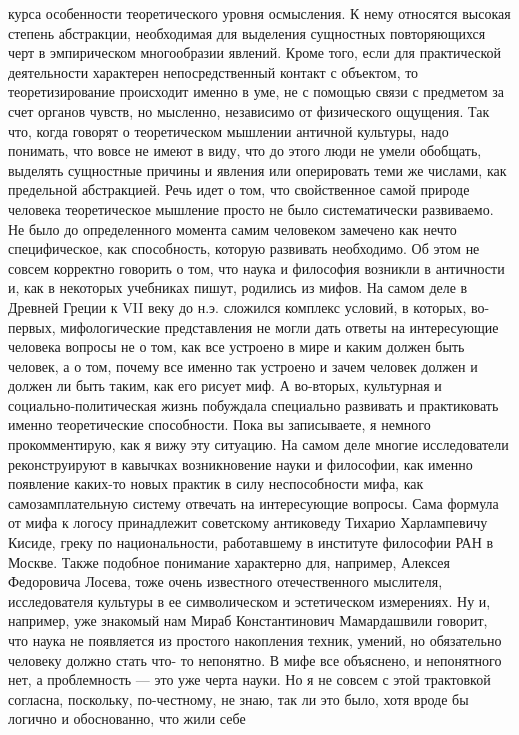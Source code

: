 курса особенности теоретического уровня осмысления. К нему относятся высокая
степень абстракции, необходимая для выделения сущностных повторяющихся черт в
эмпирическом многообразии явлений. Кроме того, если для практической
деятельности характерен непосредственный контакт с объектом, то теоретизирование
происходит именно в уме, не с помощью связи с предметом за счет органов чувств,
но мысленно, независимо от физического ощущения. Так что, когда говорят о
теоретическом мышлении античной культуры, надо понимать, что вовсе не имеют в
виду, что до этого люди не умели обобщать, выделять сущностные причины и явления
или оперировать теми же числами, как предельной абстракцией. Речь идет о том,
что свойственное самой природе человека теоретическое мышление просто не было
систематически развиваемо. Не было до определенного момента самим человеком
замечено как нечто специфическое, как способность, которую развивать необходимо.
Об этом не совсем корректно говорить о том, что наука и философия возникли в
античности и, как в некоторых учебниках пишут, родились из мифов. На самом деле
в Древней Греции к VII веку до н.э. сложился комплекс условий, в которых, во-
первых, мифологические представления не могли дать ответы на интересующие
человека вопросы не о том, как все устроено в мире и каким должен быть человек,
а о том, почему все именно так устроено и зачем человек должен и должен ли быть
таким, как его рисует миф. А во-вторых, культурная и социально-политическая
жизнь побуждала специально развивать и практиковать именно теоретические
способности. Пока вы записываете, я немного прокомментирую, как я вижу эту
ситуацию. На самом деле многие исследователи реконструируют в кавычках
возникновение науки и философии, как именно появление каких-то новых практик в
силу неспособности мифа, как самозамплательную систему отвечать на интересующие
вопросы. Сама формула от мифа к логосу принадлежит советскому антиковеду Тихарио
Харлампевичу Кисиде, греку по национальности, работавшему в институте философии
РАН в Москве. Также подобное понимание характерно для, например, Алексея
Федоровича Лосева, тоже очень известного отечественного мыслителя, исследователя
культуры в ее символическом и эстетическом измерениях. Ну и, например, уже
знакомый нам Мираб Константинович Мамардашвили говорит, что наука не появляется
из простого накопления техник, умений, но обязательно человеку должно стать что-
то непонятно. В мифе все объяснено, и непонятного нет, а проблемность — это уже
черта науки. Но я не совсем с этой трактовкой согласна, поскольку, по-честному,
не знаю, так ли это было, хотя вроде бы логично и обоснованно, что жили себе
